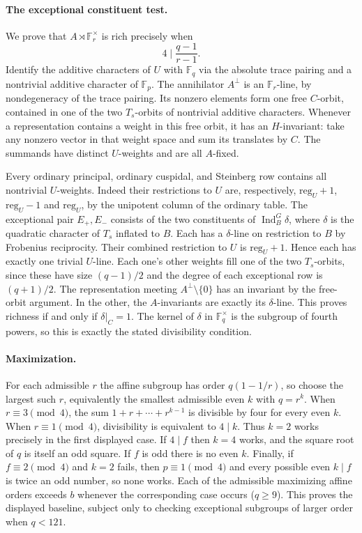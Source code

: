 \paragraph{The exceptional constituent test.}
We prove that $A\rtimes\mathbb F_r^\times$ is rich precisely when
\[
              4\mid\frac{q-1}{r-1}.
\]
Identify the additive characters of $U$ with $\mathbb F_q$ via the absolute trace pairing and a nontrivial additive character of $\mathbb F_p$. The annihilator $A^\perp$ is an $\mathbb F_r$-line, by nondegeneracy of the trace pairing. Its nonzero elements form one free $C$-orbit, contained in one of the two $T_s$-orbits of nontrivial additive characters. Whenever a representation contains a weight in this free orbit, it has an $H$-invariant: take any nonzero vector in that weight space and sum its translates by $C$. The summands have distinct $U$-weights and are all $A$-fixed.

Every ordinary principal, ordinary cuspidal, and Steinberg row contains all nontrivial $U$-weights. Indeed their restrictions to $U$ are, respectively, $\mathrm{reg}_U+1$, $\mathrm{reg}_U-1$ and $\mathrm{reg}_U$, by the unipotent column of the ordinary table. The exceptional pair $E_+,E_-$ consists of the two constituents of $\operatorname{Ind}_B^G\delta$, where $\delta$ is the quadratic character of $T_s$ inflated to $B$. Each has a $\delta$-line on restriction to $B$ by Frobenius reciprocity. Their combined restriction to $U$ is $\mathrm{reg}_U+1$. Hence each has exactly one trivial $U$-line. Each one's other weights fill one of the two $T_s$-orbits, since these have size $(q-1)/2$ and the degree of each exceptional row is $(q+1)/2$. The representation meeting $A^\perp\setminus\{0\}$ has an invariant by the free-orbit argument. In the other, the $A$-invariants are exactly its $\delta$-line. This proves richness if and only if $\delta|_C=1$. The kernel of $\delta$ in $\mathbb F_q^\times$ is the subgroup of fourth powers, so this is exactly the stated divisibility condition.

\paragraph{Maximization.}
For each admissible $r$ the affine subgroup has order $q(1-1/r)$, so choose the largest such $r$, equivalently the smallest admissible even $k$ with $q=r^k$. When $r\equiv3\pmod4$, the sum $1+r+\cdots+r^{k-1}$ is divisible by four for every even $k$. When $r\equiv1\pmod4$, divisibility is equivalent to $4\mid k$. Thus $k=2$ works precisely in the first displayed case. If $4\mid f$ then $k=4$ works, and the square root of $q$ is itself an odd square. If $f$ is odd there is no even $k$. Finally, if $f\equiv2\pmod4$ and $k=2$ fails, then $p\equiv1\pmod4$ and every possible even $k\mid f$ is twice an odd number, so none works. Each of the admissible maximizing affine orders exceeds $b$ whenever the corresponding case occurs ($q\ge9$). This proves the displayed baseline, subject only to checking exceptional subgroups of larger order when $q<121$.

